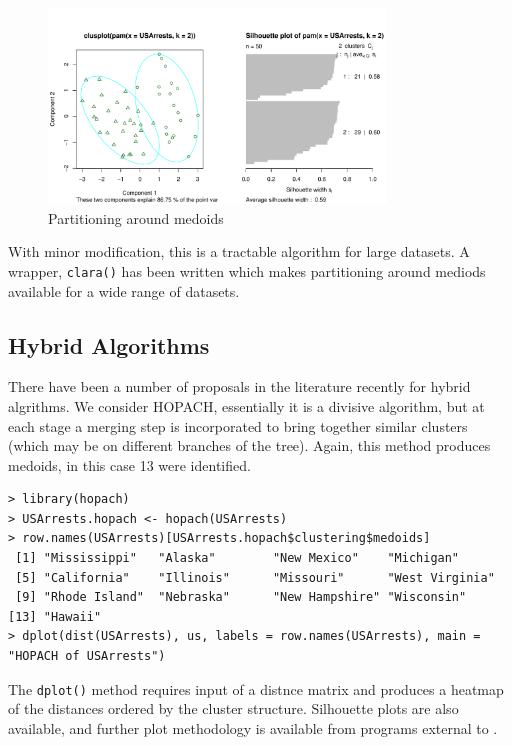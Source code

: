 \begin{figure}
\begin{center}
\includegraphics[width = 0.8\textwidth]{images/pam}
\caption{Partitioning around medoids}
\label{pam}
\end{center}
\end{figure}

With minor modification, this is a tractable algorithm for large datasets.   A wrapper, \verb+clara()+ has been written which makes partitioning around mediods available for a wide range of datasets.

\subsection{Hybrid Algorithms}

There have been a number of proposals in the literature recently for hybrid algrithms.   We consider HOPACH, essentially it is a divisive algorithm, but at each stage a merging step is incorporated to bring together similar clusters (which may be on different branches of the tree).  Again, this method produces medoids, in this case 13 were identified.

\singlespacing
\begin{verbatim}
> library(hopach)
> USArrests.hopach <- hopach(USArrests)
> row.names(USArrests)[USArrests.hopach$clustering$medoids]
 [1] "Mississippi"   "Alaska"        "New Mexico"    "Michigan"     
 [5] "California"    "Illinois"      "Missouri"      "West Virginia"
 [9] "Rhode Island"  "Nebraska"      "New Hampshire" "Wisconsin"    
[13] "Hawaii"     
> dplot(dist(USArrests), us, labels = row.names(USArrests), main = "HOPACH of USArrests")
\end{verbatim}
\onehalfspacing

The \verb+dplot()+ method requires input of a distnce matrix and produces a heatmap of the distances ordered by the cluster structure.   Silhouette plots are also available, and further plot methodology is available from programs external to \R.

